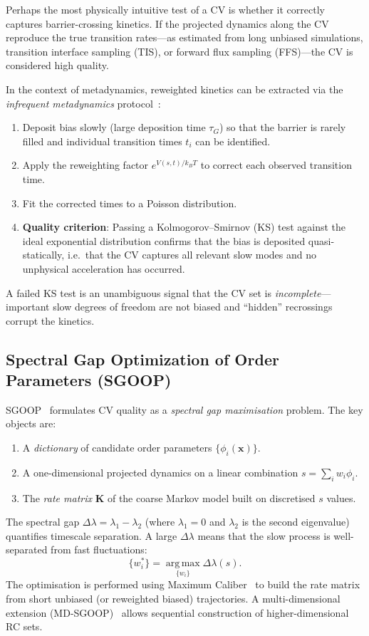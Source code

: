 \documentclass[12pt, a4paper]{article}
\begin{document}
Perhaps the most physically intuitive test of a CV is whether it 
correctly captures barrier-crossing kinetics.  If the projected dynamics 
along the CV reproduce the true transition rates---as estimated from long 
unbiased simulations, transition interface sampling (TIS), or forward 
flux sampling (FFS)---the CV is considered high quality.  

In the context of metadynamics, reweighted kinetics can be extracted 
via the \emph{infrequent metadynamics} protocol~\citep{Tiwary2015IM}:
\begin{enumerate}[noitemsep]
  \item Deposit bias slowly (large deposition time $\tau_G$) so that the 
        barrier is rarely filled and individual transition times $t_i$ 
        can be identified.
  \item Apply the reweighting factor $e^{V(s,t)/k_BT}$ to correct each 
        observed transition time.
  \item Fit the corrected times to a Poisson distribution.
  \item \textbf{Quality criterion}: Passing a Kolmogorov--Smirnov (KS) 
        test against the ideal exponential distribution confirms that the 
        bias is deposited quasi-statically, i.e.\ that the CV captures 
        all relevant slow modes and no unphysical acceleration has 
        occurred.
\end{enumerate}
A failed KS test is an unambiguous signal that the CV set is 
\emph{incomplete}---important slow degrees of freedom are not biased 
and ``hidden'' recrossings corrupt the kinetics.

\subsection{Spectral Gap Optimization of Order Parameters (SGOOP)}
\label{sec:sgoop}

SGOOP~\citep{Tiwary2016SGOOP} formulates CV quality as a 
\emph{spectral gap maximisation} problem.  The key objects are:
\begin{enumerate}[noitemsep]
  \item A \emph{dictionary} of candidate order parameters 
        $\{\phi_i(\mathbf{x})\}$.
  \item A one-dimensional projected dynamics on a linear combination 
        $s = \sum_i w_i \phi_i$.
  \item The \emph{rate matrix} $\mathbf{K}$ of the coarse Markov model 
        built on discretised $s$ values.
\end{enumerate}
The spectral gap $\Delta\lambda = \lambda_1 - \lambda_2$ (where 
$\lambda_1=0$ and $\lambda_2$ is the second eigenvalue) quantifies 
timescale separation.  A large $\Delta\lambda$ means that the slow 
process is well-separated from fast fluctuations:
\begin{equation}
  \{w_i^*\} = \operatorname*{arg\,max}_{\{w_i\}} \Delta\lambda(s).
\end{equation}
The optimisation is performed using Maximum Caliber~\citep{Jaynes1980} 
to build the rate matrix from short unbiased (or reweighted biased) 
trajectories.  A multi-dimensional extension (MD-SGOOP)~\citep{Smith2018SGOOP} 
allows sequential construction of higher-dimensional RC sets.
\end{document}
